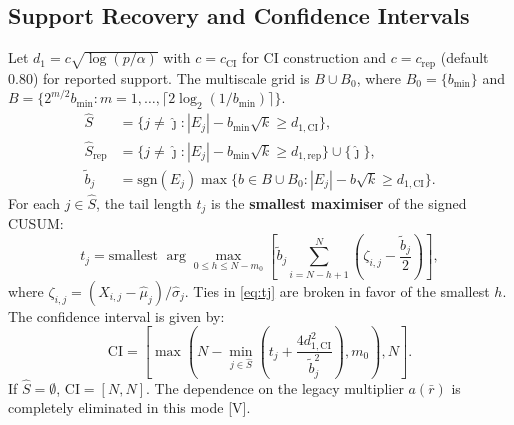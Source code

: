 \documentclass[11pt]{article}
\begin{document}
\subsection{Support Recovery and Confidence Intervals}
Let $d_1 = c \sqrt{\log(p/\alpha)}$ with $c = c_{\text{CI}}$ for CI construction and $c = c_{\text{rep}}$ (default $0.80$) for reported support.
The multiscale grid is $B \cup B_0$, where $B_0 = \{b_{\min}\}$ and $B = \{2^{m/2} b_{\min} : m = 1, \ldots, \lceil 2 \log_2(1/b_{\min}) \rceil\}$.
\begin{align}
    \hat{S} &= \{j \neq \hat{\jmath} : |E_j| - b_{\min} \sqrt{k} \ge d_{1,\text{CI}}\}, \label{eq:S_hat} \\
    \hat{S}_{\text{rep}} &= \{j \neq \hat{\jmath} : |E_j| - b_{\min} \sqrt{k} \ge d_{1,\text{rep}}\} \cup \{\hat{\jmath}\}, \label{eq:S_rep} \\
    \tilde{b}_j &= \text{sgn}(E_j) \max \{ b \in B \cup B_0 : |E_j| - b \sqrt{k} \ge d_{1,\text{CI}} \}. \label{eq:b_tilde}
\end{align}
For each $j \in \hat{S}$, the tail length $t_j$ is the \textbf{smallest maximiser} of the signed CUSUM:
\begin{equation}
    t_j = \text{smallest } \arg\max_{0 \le h \le N - m_0} \left[ \tilde{b}_j \sum_{i = N - h + 1}^N \left( \zeta_{i,j} - \frac{\tilde{b}_j}{2} \right) \right], \label{eq:tj}
\end{equation}
where $\zeta_{i,j} = (X_{i,j} - \hat{\mu}_j)/\hat{\sigma}_j$. Ties in \eqref{eq:tj} are broken in favor of the smallest $h$.
The confidence interval is given by:
\begin{equation}
    \text{CI} = \left[ \max\left( N - \min_{j \in \hat{S}} \left( t_j + \frac{4 d_{1,\text{CI}}^2}{\tilde{b}_j^2} \right), m_0 \right), N \right]. \label{eq:CI}
\end{equation}
If $\hat{S} = \emptyset$, $\text{CI} = [N, N]$. The dependence on the legacy multiplier $a(\bar{r})$ is completely eliminated in this mode [V].
\end{document}

